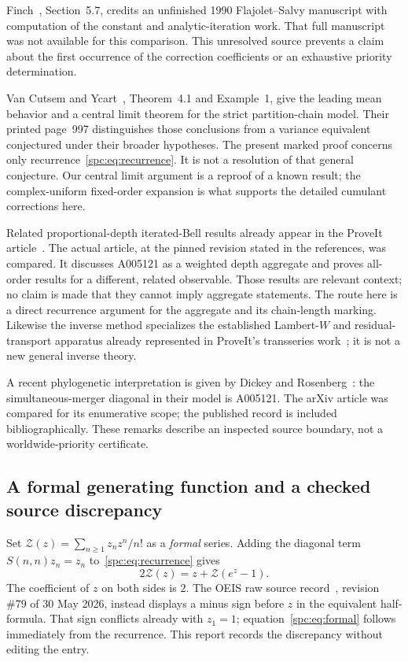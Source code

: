 \documentclass[11pt,letterpaper]{article}
\theoremstyle{definition}\newtheorem{definition}[theorem]{Definition}
\theoremstyle{remark}\newtheorem{remark}[theorem]{Remark}
\begin{document}
Finch~\cite{Finch}, Section~5.7, credits an unfinished 1990 Flajolet--Salvy manuscript with computation of the constant and analytic-iteration work. That full manuscript was not available for this comparison. This unresolved source prevents a claim about the first occurrence of the correction coefficients or an exhaustive priority determination.

Van Cutsem and Ycart~\cite{VanCutsemYcart}, Theorem~4.1 and Example~1, give the leading mean behavior and a central limit theorem for the strict partition-chain model. Their printed page~997 distinguishes those conclusions from a variance equivalent conjectured under their broader hypotheses. The present marked proof concerns only recurrence~\eqref{spc:eq:recurrence}. It is not a resolution of that general conjecture. Our central limit argument is a reproof of a known result; the complex-uniform fixed-order expansion is what supports the detailed cumulant corrections here.

Related proportional-depth iterated-Bell results already appear in the ProveIt article~\cite{ProveItBell}. The actual article, at the pinned revision stated in the references, was compared. It discusses A005121 as a weighted depth aggregate and proves all-order results for a different, related observable. Those results are relevant context; no claim is made that they cannot imply aggregate statements. The route here is a direct recurrence argument for the aggregate and its chain-length marking. Likewise the inverse method specializes the established Lambert-$W$ and residual-transport apparatus already represented in ProveIt's transseries work~\cite{ProveItTransseries}; it is not a new general inverse theory.

A recent phylogenetic interpretation is given by Dickey and Rosenberg~\cite{DickeyRosenberg}: the simultaneous-merger diagonal in their model is A005121. The arXiv article was compared for its enumerative scope; the published record is included bibliographically. These remarks describe an inspected source boundary, not a worldwide-priority certificate.

\subsection{A formal generating function and a checked source discrepancy}
Set $\mathcal Z(z)=\sum_{n\ge1}z_nz^n/n!$ as a \emph{formal} series. Adding the diagonal term $S(n,n)z_n=z_n$ to~\eqref{spc:eq:recurrence} gives
\begin{equation}\label{spc:eq:formal}
 2\mathcal Z(z)=z+\mathcal Z(e^z-1).
\end{equation}
The coefficient of $z$ on both sides is $2$. The OEIS raw source record~\cite{OEIS}, revision \#79 of 30 May 2026, instead displays a minus sign before $z$ in the equivalent half-formula. That sign conflicts already with $z_1=1$; equation~\eqref{spc:eq:formal} follows immediately from the recurrence. This report records the discrepancy without editing the entry.
\end{document}
